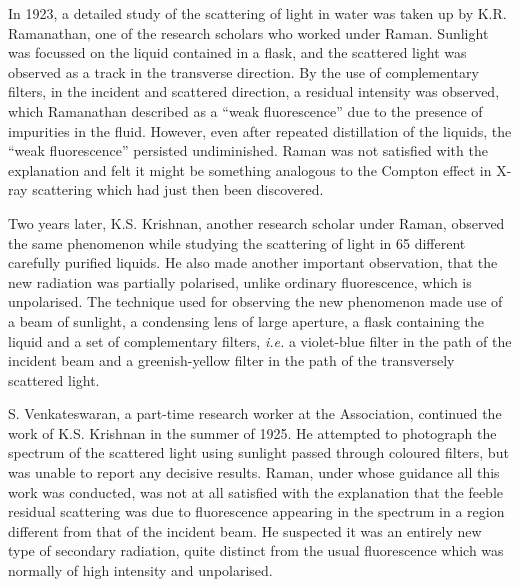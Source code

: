 \medskip
{}
\medskip



\noindent
In 1923, a detailed study of the scattering of light in water
was taken up by K.R. Ramanathan, one of the research scholars
who worked under Raman. Sunlight was focussed on the liquid
contained in a flask, and the scattered light was observed as a
track in the transverse direction. By the use of complementary
filters, in the incident and scattered direction, a residual intensity
was observed, which \hbox{Ramanathan} described as a ``weak
fluorescence'' due to the presence of impurities in the fluid.
However, even after repeated distillation of the liquids, the ``weak
fluorescence'' persisted undiminished. Raman was not satisfied
with the explanation and felt it might be something analogous
to the Compton effect in X-ray scattering which had just then
been discovered.

Two years later, K.S. Krishnan, another research scholar
under Raman, observed the same phenomenon while studying
the scattering of light in 65 different carefully purified liquids.
He also made another important observation, that the new
radiation was partially polarised, unlike ordinary fluorescence,
which is unpolarised. The technique used for observing the new
phenomenon made use of a beam of sunlight, a condensing lens
of large aperture, a flask containing the liquid and a set of
complementary filters, {\em i.e.} a violet-blue filter in the path of the
incident beam and a greenish-yellow filter in the path of the
transversely scattered light.

S. Venkateswaran, a part-time research worker at the
Association, continued the work of K.S. Krishnan in the summer
of 1925. He attempted to photograph the spectrum of the
scattered light using sunlight passed through coloured filters, but
was unable to report any decisive results. Raman, under whose
guidance all this work was conducted, was not at all satisfied with
the explanation that the feeble residual scattering was due to
fluorescence appearing in the spectrum in a region different
from that of the incident beam. He suspected it was an entirely
new type of secondary radiation, quite distinct from the usual
fluorescence which was normally of high intensity and
unpolarised.

